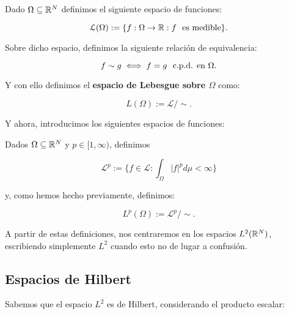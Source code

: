 \begin{definicion}

    Dado $\Omega \subseteq \mathbb{R}^N$ definimos el siguiente espacio de funciones:

    \begin{equation}
        \mathcal{L}(\Omega) := \{f: \Omega \to \mathbb{R} : f \ \  \text{es medible} \}.
    \end{equation}

    Sobre dicho espacio, definimos la siguiente relación de equivalencia:

    \begin{equation}
        f \sim g \iff f = g \ \  \text{c.p.d. en } \Omega.
    \end{equation}

    Y con ello definimos el \textbf{espacio de Lebesgue sobre $\Omega$} como:

    \begin{equation}
        L(\Omega) := \mathcal{L} / \sim .
    \end{equation}
\end{definicion}

Y ahora, introducimos los siguientes espacios de funciones:

\begin{definicion}
    Dados $\Omega \subseteq \mathbb{R}^N$ y $p \in [1, \infty)$, definimos

    \begin{equation}
        \mathcal{L}^p := \{ f \in \mathcal{L} : \int_{\Omega} |f|^p d\mu < \infty \}
    \end{equation}

    y, como hemos hecho previamente, definimos:

    \begin{equation}
        L^p(\Omega) := \mathcal{L}^p / \sim.
    \end{equation}

\end{definicion}

A partir de estas definiciones, nos centraremos en los espacios $L^2(\mathbb{R}^N)$, escribiendo simplemente $L^2$ cuando esto no de lugar a confusión.

\subsection{Espacios de Hilbert}

Sabemos que el espacio $L^2$ es de Hilbert, considerando el producto escalar:

